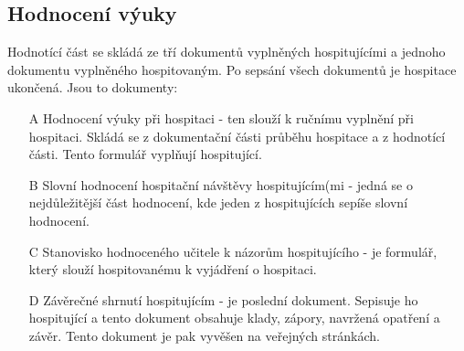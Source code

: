 \subsection{Hodnocení výuky}
Hodnotící část se skládá ze tří dokumentů vyplněných hospitujícími a jednoho dokumentu vyplněného hospitovaným. Po sepsání všech dokumentů je hospitace ukončená. Jsou to dokumenty:
\begin{itemize}
\item[A] Hodnocení výuky při hospitaci - ten slouží k ručnímu vyplnění při hospitaci. Skládá se z dokumentační části průběhu hospitace a z hodnotící části. Tento formulář vyplňují hospitující.
\item[B] Slovní hodnocení hospitační návštěvy hospitujícím(mi - jedná se o nejdůležitější část hodnocení, kde jeden z hospitujících sepíše slovní hodnocení.
\item[C] Stanovisko hodnoceného učitele k názorům hospitujícího - je formulář, který slouží hospitovanému k vyjádření o hospitaci.
\item[D] Závěrečné shrnutí hospitujícím - je poslední dokument. Sepisuje ho hospitující a tento dokument obsahuje klady, zápory, navržená opatření a závěr. Tento dokument je pak vyvěšen na veřejných stránkách.
\end{itemize}